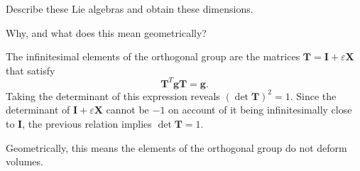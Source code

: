 \documentclass[../the-road-to-reality.tex]{subfiles}
\begin{document}
\begin{questions}
\question Describe these Lie algebras and obtain these dimensions.

\question Why, and what does this mean geometrically?

\begin{solution}
	The infinitesimal elements of the orthogonal group are the matrices $\mathbf{T} = \mathbf{I} + \varepsilon\mathbf{X}$ that satisfy
	\[
	\mathbf{T}^T\mathbf{g}\mathbf{T} = \mathbf{g}.
	\] 
	Taking the determinant of this expression reveals $(\det\mathbf{T})^2 = 1$. Since the determinant of $\mathbf{I} + \varepsilon\mathbf{X}$ cannot be $-1$ on account of it being infinitesimally close to $\mathbf{I}$, the previous relation implies $\det\mathbf{T} = 1$.

	Geometrically, this means the elements of the orthogonal group do not deform volumes.
\end{solution}

\end{questions}
\end{document}
